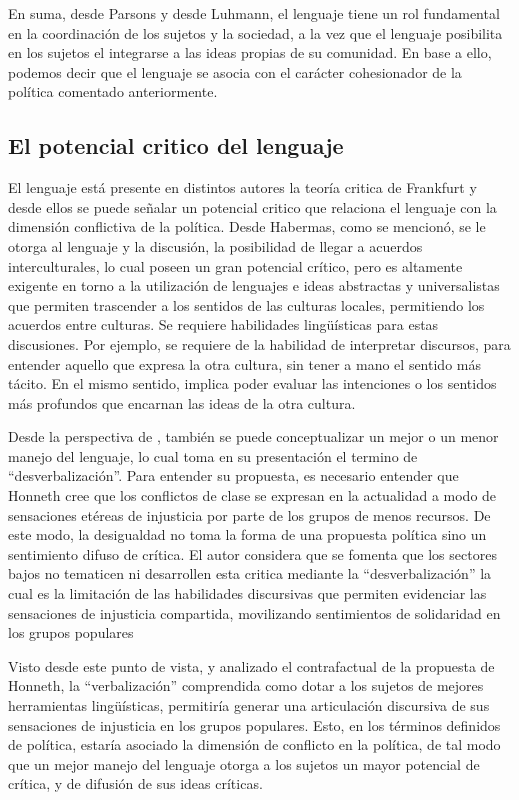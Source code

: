 \documentclass[12pt,twoside]{templates/facsothesis}
\begin{document}
En suma, desde Parsons y desde Luhmann, el lenguaje tiene un rol fundamental en la coordinación de los sujetos y la sociedad, a la vez que el lenguaje posibilita en los sujetos el integrarse a las ideas propias de su comunidad. En base a ello, podemos decir que el lenguaje se asocia con el carácter cohesionador de la política comentado anteriormente.

\hypertarget{el-potencial-critico-del-lenguaje}{%
\subsection{El potencial critico del lenguaje}\label{el-potencial-critico-del-lenguaje}}

El lenguaje está presente en distintos autores la teoría critica de Frankfurt y desde ellos se puede señalar un potencial critico que relaciona el lenguaje con la dimensión conflictiva de la política. Desde Habermas, como se mencionó, se le otorga al lenguaje y la discusión, la posibilidad de llegar a acuerdos interculturales, lo cual poseen un gran potencial crítico, pero es altamente exigente en torno a la utilización de lenguajes e ideas abstractas y universalistas que permiten trascender a los sentidos de las culturas locales, permitiendo los acuerdos entre culturas. Se requiere habilidades lingüísticas para estas discusiones. Por ejemplo, se requiere de la habilidad de interpretar discursos, para entender aquello que expresa la otra cultura, sin tener a mano el sentido más tácito. En el mismo sentido, implica poder evaluar las intenciones o los sentidos más profundos que encarnan las ideas de la otra cultura.

Desde la perspectiva de \citet{honneth_sociedad_2011}, también se puede conceptualizar un mejor o un menor manejo del lenguaje, lo cual toma en su presentación el termino de ``desverbalización''. Para entender su propuesta, es necesario entender que Honneth cree que los conflictos de clase se expresan en la actualidad a modo de sensaciones etéreas de injusticia por parte de los grupos de menos recursos. De este modo, la desigualdad no toma la forma de una propuesta política sino un sentimiento difuso de crítica. El autor considera que se fomenta que los sectores bajos no tematicen ni desarrollen esta critica mediante la ``desverbalización'' la cual es la limitación de las habilidades discursivas que permiten evidenciar las sensaciones de injusticia compartida, movilizando sentimientos de solidaridad en los grupos populares

Visto desde este punto de vista, y analizado el contrafactual de la propuesta de Honneth, la ``verbalización'' comprendida como dotar a los sujetos de mejores herramientas lingüísticas, permitiría generar una articulación discursiva de sus sensaciones de injusticia en los grupos populares. Esto, en los términos definidos de política, estaría asociado la dimensión de conflicto en la política, de tal modo que un mejor manejo del lenguaje otorga a los sujetos un mayor potencial de crítica, y de difusión de sus ideas críticas.
\end{document}
